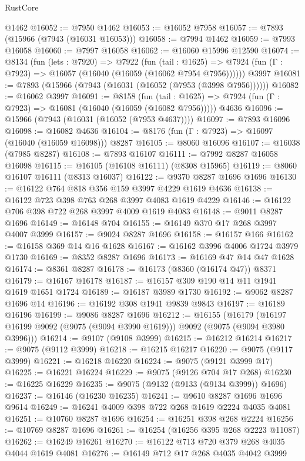 \begin{lexlean}{RustCore}
\begin{coremodule}
    @1462
@16052 := @7950 @1462
@16053 := @16052 @7958
@16057 := @7893 (@15966 (@7943 (@16031 @16053)))
@16058 := @7994 @1462
@16059 := @7993 @16058
@16060 := @7997 @16058
@16062 := @16060 @15996 @12590
@16074 := @8134
    (fun (lets : @7920) =>
    @7922
      (fun (tail : @1625) =>
      @7924 (fun (Γ : @7923) => @16057 (@16040 (@16059 (@16062 @7954 @7956))))))
    @3997
@16081 := @7893 (@15966 (@7943 (@16031 (@16052 (@7953 (@3998 @7956))))))
@16082 := @16062 @3997
@16091 := @8158
    (fun (tail : @1625) => @7924 (fun (Γ : @7923) => @16081 (@16040 (@16059 (@16082 @7956)))))
    @4636
@16096 := @15966 (@7943 (@16031 (@16052 (@7953 @4637))))
@16097 := @7893 @16096
@16098 := @16082 @4636
@16104 := @8176 (fun (Γ : @7923) => @16097 (@16040 (@16059 @16098))) @8287
@16105 := @8060 @16096
@16107 := @16038 (@7985 @8287)
@16108 := @7893 @16107
@16111 := @7992 @8287 @16058 @16098
@16115 := @16105 (@16108 @16111) (@8308 @15965)
@16119 := @8060 @16107 @16111 (@8313 @16037)
@16122 := @9370 @8287 @1696 @1696
@16130 := @16122 @764 @818 @356 @159 @3997 @4229 @1619 @4636
@16138 := @16122 @723 @398 @763 @268 @3997 @4083 @1619 @4229
@16146 := @16122 @706 @398 @722 @268 @3997 @4009 @1619 @4083
@16148 := @9011 @8287 @1696
@16149 := @16148 @704
@16155 := @16149 @370 @17 @268 @3997 @4007 @3999
@16157 := @9024 @8287 @1696
@16158 := @16157 @166
@16162 := @16158 @369 @14 @16 @1628
@16167 := @16162 @3996 @4006 @1724 @3979 @1730
@16169 := @8352 @8287 @1696
@16173 := @16169 @47 @14 @47 @1628
@16174 := @8361 @8287
@16178 := @16173 (@8360 (@16174 @47)) @8371
@16179 := @16167 @16178
@16187 := @16157 @309 @190 @14 @11 @1941 @1619 @1651 @1724
@16189 := @16187 @3989 @1730
@16192 := @9062 @8287 @1696 @14
@16196 := @16192 @308 @1941 @9839 @9843
@16197 := @16189 @16196
@16199 := @9086 @8287 @1696
@16212 := @16155
    (@16179 (@16197 @16199 @9092 (@9075 (@9094 @3990 @1619))) @9092 (@9075 (@9094 @3980 @3996)))
@16214 := @9107 (@9108 @3999)
@16215 := @16212 @16214
@16217 := @9075 (@9112 @3999)
@16218 := @16215 @16217
@16220 := @9075 (@9117 @3999)
@16221 := @16218 @16220
@16224 := @9075 (@9121 @3999 @17)
@16225 := @16221 @16224
@16229 := @9075 (@9126 @704 @17 @268)
@16230 := @16225 @16229
@16235 := @9075 (@9132 (@9133 (@9134 @3999)) @1696)
@16237 := @16146 (@16230 @16235)
@16241 := @9610 @8287 @1696 @1696 @9614
@16249 := @16241 @4009 @398 @722 @268 @1619 @2224 @4035 @4081
@16251 := @10760 @8287 @1696
@16254 := @16251 @398 @268 @2224
@16256 := @10769 @8287 @1696
@16261 := @16254 (@16256 @395 @268 @2223 @11087)
@16262 := @16249 @16261
@16270 := @16122 @713 @720 @379 @268 @4035 @4044 @1619 @4081
@16276 := @16149 @712 @17 @268 @4035 @4042 @3999

\end{coremodule}
\end{lexlean}
